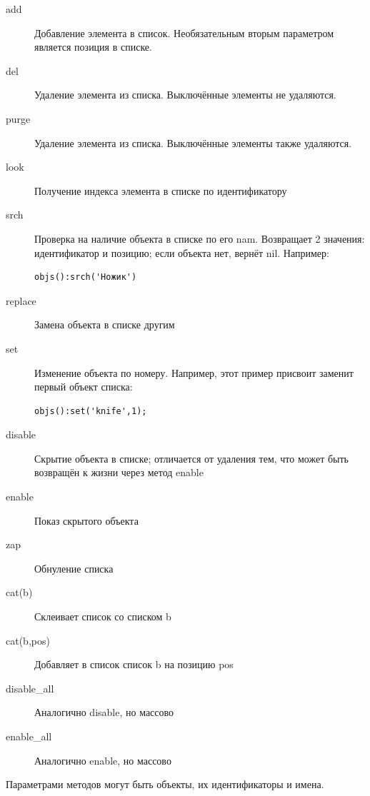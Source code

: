 \documentclass[12pt]{article}
\begin{document}
\begin{description}
\item[add]  Добавление элемента в список. Необязательным вторым параметром является позиция в списке.
\item[del]  Удаление элемента из списка. Выключённые элементы не удаляются.
\item[purge]  Удаление элемента из списка. Выключённые элементы также удаляются.
\item[look]  Получение индекса элемента в списке по идентификатору
\item[srch]  Проверка на наличие объекта в списке по его nam. Возвращает 2 значения: идентификатор и позицию; если объекта нет, вернёт nil. Например: \begin{verbatim}objs():srch('Ножик')\end{verbatim}
\item[replace]  Замена объекта в списке другим
\item[set]  Изменение объекта по номеру. Например, этот пример присвоит заменит первый объект списка: \begin{verbatim}objs():set('knife',1);\end{verbatim}
\item[disable]  Скрытие объекта в списке; отличается от удаления тем, что может быть возвращён к жизни через метод enable
\item[enable]  Показ скрытого объекта
\item[zap]  Обнуление списка
\item[cat(b)]  Склеивает список со списком b
\item[cat(b,pos)] Добавляет в список список b на позицию pos
\item[disable\_all]  Аналогично disable, но массово
\item[enable\_all]  Аналогично enable, но массово
\end{description}

Параметрами методов могут быть объекты, их идентификаторы и имена.
\end{document}
